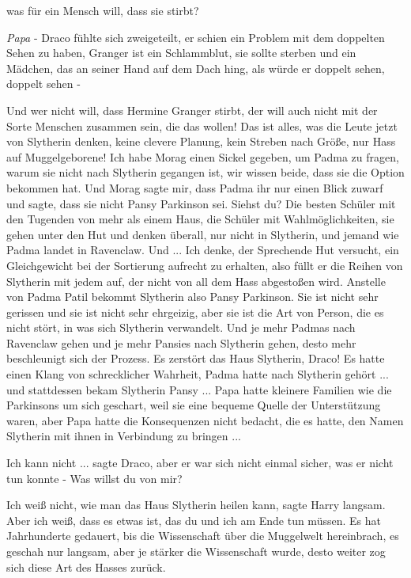 \glqq{}was für ein Mensch will, dass sie stirbt?\grqq{}

\emph{Papa} - Draco fühlte sich zweigeteilt, er schien ein Problem mit dem
doppelten Sehen zu haben, Granger ist ein Schlammblut, sie sollte sterben und
ein Mädchen, das an seiner Hand auf dem Dach hing, als würde er doppelt sehen,
doppelt sehen -

\glqq{}Und wer nicht will, dass Hermine Granger stirbt, der will auch nicht mit
der Sorte Menschen zusammen sein, die das wollen! Das ist alles, was die Leute
jetzt von Slytherin denken, keine clevere Planung, kein Streben nach Größe, nur
Hass auf Muggelgeborene! Ich habe Morag einen Sickel gegeben, um Padma zu
fragen, warum sie nicht nach Slytherin gegangen ist, wir wissen beide, dass sie
die Option bekommen hat. Und Morag sagte mir, dass Padma ihr nur einen Blick
zuwarf und sagte, dass sie nicht Pansy Parkinson sei. Siehst du? Die besten
Schüler mit den Tugenden von mehr als einem Haus, die Schüler mit
Wahlmöglichkeiten, sie gehen unter den Hut und denken überall, nur nicht in
Slytherin, und jemand wie Padma landet in Ravenclaw. Und ... Ich denke, der
Sprechende Hut versucht, ein Gleichgewicht bei der Sortierung aufrecht zu
erhalten, also füllt er die Reihen von Slytherin mit jedem auf, der nicht von
all dem Hass abgestoßen wird. Anstelle von Padma Patil bekommt Slytherin also
Pansy Parkinson. Sie ist nicht sehr gerissen und sie ist nicht sehr ehrgeizig,
aber sie ist die Art von Person, die es nicht stört, in was sich Slytherin
verwandelt. Und je mehr Padmas nach Ravenclaw gehen und je mehr Pansies nach
Slytherin gehen, desto mehr beschleunigt sich der Prozess. Es zerstört das Haus
Slytherin, Draco!\grqq{} Es hatte einen Klang von schrecklicher Wahrheit, Padma
hatte nach Slytherin gehört ... und stattdessen bekam Slytherin Pansy ... Papa
hatte kleinere Familien wie die Parkinsons um sich geschart, weil sie eine
bequeme Quelle der Unterstützung waren, aber Papa hatte die Konsequenzen nicht
bedacht, die es hatte, den Namen Slytherin mit ihnen in Verbindung zu bringen ...

\glqq{}Ich kann nicht ...\grqq{} sagte Draco, aber er war sich nicht einmal
sicher, was er nicht tun konnte - \glqq{}Was willst du von mir?\grqq{}

\glqq{}Ich weiß nicht, wie man das Haus Slytherin heilen kann\grqq{}, sagte Harry
langsam. \glqq{}Aber ich weiß, dass es etwas ist, das du und ich am Ende tun
müssen. Es hat Jahrhunderte gedauert, bis die Wissenschaft über die Muggelwelt
hereinbrach, es geschah nur langsam, aber je stärker die Wissenschaft wurde,
desto weiter zog sich diese Art des Hasses zurück.\grqq{}

